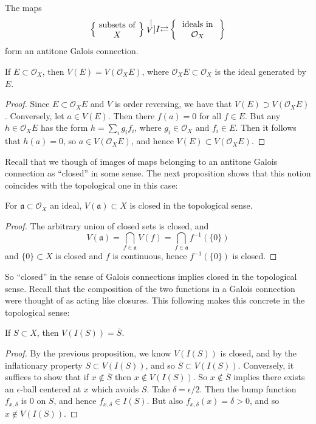 \documentclass[12pt]{article}
\begin{document}
\begin{corollary}
	The maps 
	\begin{equation*}
		\left\{\parbox{5em}{\centering{subsets of $X$}}\right\} \stackrel[V]{I}{\rightleftarrows} \left\{\parbox{5em}{\centering{ideals in $\mathcal{O}_X$}}\right\} 
	\end{equation*}
	form an antitone Galois connection.
\end{corollary}

\begin{proposition}
	If $E\subset\mathcal{O}_X$, then $V(E)=V(\mathcal{O}_XE)$, where $\mathcal{O}_XE\subset\mathcal{O}_X$ is the ideal generated by $E$.
\end{proposition}
\begin{proof}
	Since $E\subset \mathcal{O}_XE$ and $V$ is order reversing, we have that $V(E) \supset V(\mathcal{O}_XE)$. Conversely, let $a\in V(E)$. Then there $f(a)=0$ for all $f\in E$. But any $h\in \mathcal{O}_XE$ has the form $h=\sum_i g_if_i$, where $g_i\in\mathcal{O}_X$ and $f_i\in E$. Then it follows that $h(a)=0$, so $a\in V(\mathcal{O}_XE)$, and hence $V(E) \subset V(\mathcal{O}_XE)$.
\end{proof}

Recall that we though of images of maps belonging to an antitone Galois connection as ``closed'' in some sense. The next proposition shows that this notion coincides with the topological one in this case:

\begin{proposition}
	For $\mathfrak{a}\subset\mathcal{O}_X$ an ideal, $V(\mathfrak{a})\subset X$ is closed in the topological sense.
\end{proposition}
\begin{proof}
	The arbitrary union of closed sets is closed, and 
	\begin{equation*}
		V(\mathfrak{a}) = \bigcap_{f\in\mathfrak{a}}V(f) = \bigcap_{f\in\mathfrak{a}}f^{-1}(\{0\})
	\end{equation*}
	and $\{0\}\subset X$ is closed and $f$ is continuous, hence $f^{-1}(\{0\})$ is closed.
\end{proof}

So ``closed'' in the sense of Galois connections implies closed in the topological sense. Recall that the composition of the two functions in a Galois connection were thought of as acting like closures. This following makes this concrete in the topological sense:

\begin{proposition}
	If $S\subset X$, then $V(I(S))=\overline{S}$. 
\end{proposition}
\begin{proof}
	By the previous proposition, we know $V(I(S))$ is closed, and by the inflationary property $S\subset V(I(S))$, and so $\overline{S}\subset V(I(S))$. Conversely, it suffices to show that if $x\not\in\overline{S}$ then $x\not\in V(I(S))$. So $x\not\in\overline{S}$ implies there exists an $\epsilon$-ball centered at $x$ which avoids $S$. Take $\delta=\epsilon/2$. Then the bump function $f_{x,\delta}$ is 0 on $S$, and hence $f_{x,\delta}\in I(S)$. But also $f_{x,\delta}(x)=\delta>0$, and so $x\not\in V(I(S))$.
\end{proof}
\end{document}
